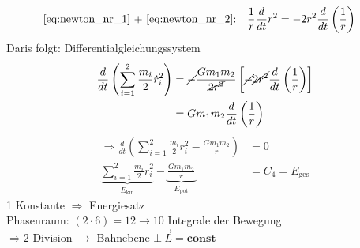 \begin{description}
\begin{align}
            \text{\autoref{eq:newton_nr_1} + \autoref{eq:newton_nr_2}:}\quad \frac{1}{r} \frac{d}{dt} r^2 &= -2r^2 \frac{d}{dt}\left(\frac{1}{r}\right)
        \end{align}
        \color{black}
        Daris folgt: Differentialgleichungssystem
        \begin{align*}
            \frac{d}{dt}\left(\sum\limits_{i=1}^{2} \frac{m_i}{2} \dot r^2_i\right) &= \cancel{-}\frac{Gm_1m_2}{\cancel{2r^2}} \left[\cancel{-}\cancel{2r^2}\frac{d}{dt} \left(\frac{1}{r}\right)\right]\\
                                &= Gm_1m_2 \frac{d}{dt} \left(\frac{1}{r}\right)
        \end{align*}
        \begin{align*}
            \Rightarrow \frac{d}{dt} \left(\sum_{i = 1}^{2} \frac{m_i}{2} r_i^2 - \frac{Gm_1m_2}{r}\right) &= 0 \tag{s. dd}\\
            \underbrace{\sum\limits_{i = 1}^2 \frac{m_i}{2} \dot{r}_i^2}_{E_{\text{kin}}} - \underbrace{\frac{Gm_1m_2}{r}}_{E_{\text{pot}}} &= C_4 = E_{\text{ges}}
        \end{align*}   
        1 Konstante $\Rightarrow$ Energiesatz \\
        Phasenraum: $(2 \cdot 6) = 12 \rightarrow 10$ Integrale der Bewegung\\
        $\Rightarrow 2$ Division $\rightarrow$ Bahnebene $\bot\ \vec L = \mathbf{const}$
\end{description}
